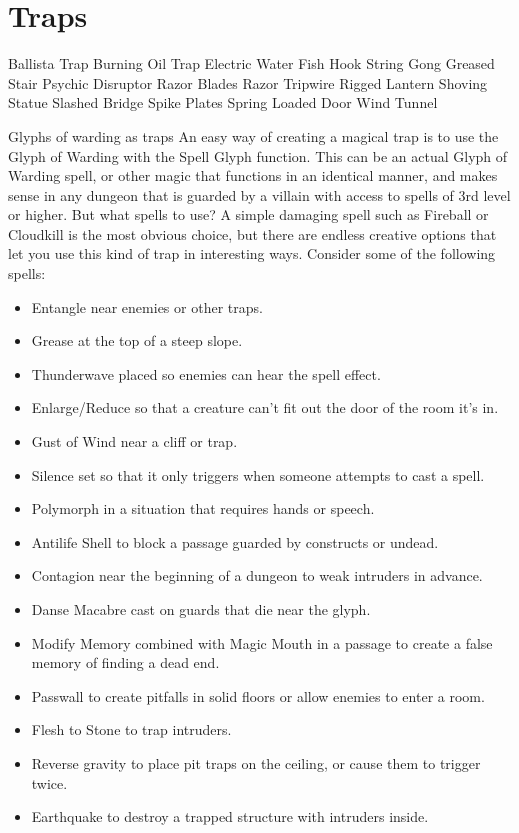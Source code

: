 \documentclass[10pt,a4paper,twoside,twocolumn,openany,bg=print,nodeprecatedcode]{dndbook}
\begin{document}
\chapter{Traps}
Ballista Trap
Burning Oil Trap
Electric Water
Fish Hook String
Gong
Greased Stair
Psychic Disruptor
Razor Blades
Razor Tripwire
Rigged Lantern
Shoving Statue
Slashed Bridge
Spike Plates
Spring Loaded Door
Wind Tunnel
\begin{DndComment}{Glyphs of warding as traps}
An easy way of creating a magical trap is to use the Glyph of Warding with the Spell Glyph function. This can be an actual Glyph of Warding spell, or other magic that functions in an identical manner, and makes sense in any dungeon that is guarded by a villain with access to spells of 3rd level or higher. But what spells to use? A simple damaging spell such as Fireball or Cloudkill is the most obvious choice, but there are endless creative options that let you use this kind of trap in interesting ways. Consider some of the following spells:

\begin{itemize}
\item Entangle near enemies or other traps.
\item Grease at the top of a steep slope.
\item Thunderwave placed so enemies can hear the spell effect.
\item Enlarge/Reduce so that a creature can't fit out the door of the room it's in.
\item Gust of Wind near a cliff or trap.
\item Silence set so that it only triggers when someone attempts to cast a spell.
\item Polymorph in a situation that requires hands or speech.
\item Antilife Shell to block a passage guarded by constructs or undead.
\item Contagion near the beginning of a dungeon to weak intruders in advance.
\item Danse Macabre cast on guards that die near the glyph.
\item Modify Memory combined with Magic Mouth in a passage to create a false memory of finding a dead end.
\item Passwall to create pitfalls in solid floors or allow enemies to enter a room.
\item Flesh to Stone to trap intruders.
\item Reverse gravity to place pit traps on the ceiling, or cause them to trigger twice.
\item Earthquake to destroy a trapped structure with intruders inside.
\end{itemize}

\end{DndComment}
\end{document}
